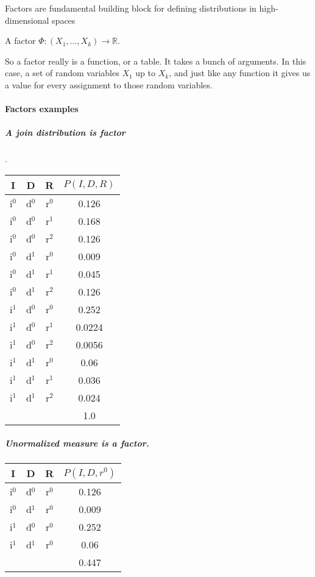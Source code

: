 
\begin{framed}
Factors are fundamental building block for defining distributions in high-dimensional spaces 
\end{framed}

A factor $\Phi : (X_1, \dots, X_k) \rightarrow \mathbb{R}$.

So a factor really is a function, or a table. 
It takes a bunch of arguments. In this case, a set of random variables
$X_1$ up to $X_k$, and just like any function it gives us a value for every assignment to those random variables.  \\

\paragraph{Factors examples}

\subparagraph{A join distribution is factor}.

\begin{tabular}{|c|c|c|c|}
 \hline
 I & D & R & $P(I,D,R)$ \\ \hline
 i$^0$ & d$^0$ & r$^0$ & 0.126 \\ \hline
 i$^0$ & d$^0$ & r$^1$ & 0.168 \\ \hline
 i$^0$ & d$^0$ & r$^2$ & 0.126 \\ \hline
 i$^0$ & d$^1$ & r$^0$ & 0.009 \\ \hline
 i$^0$ & d$^1$ & r$^1$ & 0.045 \\ \hline
 i$^0$ & d$^1$ & r$^2$ & 0.126 \\ \hline
 i$^1$ & d$^0$ & r$^0$ & 0.252 \\ \hline
 i$^1$ & d$^0$ & r$^1$ & 0.0224 \\ \hline
 i$^1$ & d$^0$ & r$^2$ & 0.0056 \\ \hline
 i$^1$ & d$^1$ & r$^0$ & 0.06 \\ \hline
 i$^1$ & d$^1$ & r$^1$ & 0.036 \\ \hline
 i$^1$ & d$^1$ & r$^2$ & 0.024 \\ \hline \hline
         &         &         & 1.0     \\ \hline
 \end{tabular}

 
\subparagraph{Unormalized measure is a factor.}
 
 \begin{tabular}{|c|c|c|c|}
 \hline
 I & D & R & $P(I,D,r^0)$ \\ \hline
 i$^0$ & d$^0$ & r$^0$ & 0.126 \\ \hline
 i$^0$ & d$^1$ & r$^0$ & 0.009 \\ \hline
 i$^1$ & d$^0$ & r$^0$ & 0.252 \\ \hline
 i$^1$ & d$^1$ & r$^0$ & 0.06 \\ \hline
       &       &       & 0.447     \\ \hline
 \end{tabular}
 
